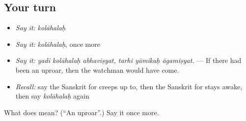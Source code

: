 \subsection*{Your turn}
\begin{itemize}
\raggedright
  \item \emph{Say it:} \emph{kolāhalaḥ}
  \item \emph{Say it:} \emph{kolāhalaḥ}, once more
  \item \emph{Say it:} \emph{yadi kolāhalaḥ abhaviṣyat, tarhi yāmikaḥ āgamiṣyat.} — If there had been an uproar, then the watchman would have come.
  \item \emph{Recall:} say the Sanskrit for creeps up to, then the Sanskrit for stays awake, then say \emph{kolāhalaḥ} again
\end{itemize}

\begin{tcolorbox}[breakable,colback=teal!4,colframe=teal!35!black,title={Before you move on}]
What does  mean? (\textquotedblleft{}An uproar\textquotedblright{}.) Say it once more.
\end{tcolorbox}
